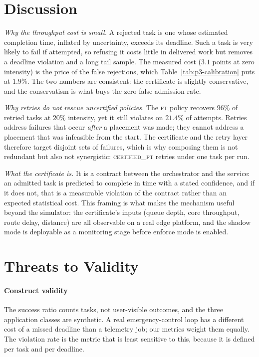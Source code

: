 \documentclass[journal,10pt]{IEEEtran}
\begin{document}
\section{Discussion}
\label{sec:discussion}

\emph{Why the throughput cost is small.} A rejected task is one whose estimated
completion time, inflated by uncertainty, exceeds its deadline. Such a task is
very likely to fail if attempted, so refusing it costs little in delivered work
but removes a deadline violation and a long tail sample. The measured cost
($3.1$ points at zero intensity) is the price of the false rejections, which
Table~\ref{tab:p3-calibration} puts at $1.9\%$. The two numbers are consistent:
the certificate is slightly conservative, and the conservatism is what buys the
zero false-admission rate.

\emph{Why retries do not rescue uncertified policies.} The \textsc{ft} policy
recovers $96\%$ of retried tasks at $20\%$ intensity, yet it still violates on
$21.4\%$ of attempts. Retries address failures that occur \emph{after} a
placement was made; they cannot address a placement that was infeasible from
the start. The certificate and the retry layer therefore target disjoint sets of
failures, which is why composing them is not redundant but also not
synergistic: \textsc{certified\_ft} retries under one task per run.

\emph{What the certificate is.} It is a contract between the orchestrator and
the service: an admitted task is predicted to complete in time with a stated
confidence, and if it does not, that is a measurable violation of the contract
rather than an expected statistical cost. This framing is what makes the
mechanism useful beyond the simulator: the certificate's inputs (queue depth,
core throughput, route delay, distance) are all observable on a real edge
platform, and the shadow mode is deployable as a monitoring stage before enforce
mode is enabled.

\section{Threats to Validity}
\label{sec:threats}

\paragraph{Construct validity}
The success ratio counts tasks, not user-visible outcomes, and the three
application classes are synthetic. A real emergency-control loop has a
different cost of a missed deadline than a telemetry job; our metrics weight
them equally. The violation rate is the metric that is least sensitive to this,
because it is defined per task and per deadline.
\end{document}
